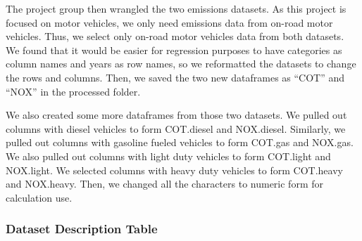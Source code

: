 \documentclass[
  12pt,
]{article}
\begin{document}
The project group then wrangled the two emissions datasets. As this
project is focused on motor vehicles, we only need emissions data from
on-road motor vehicles. Thus, we select only on-road motor vehicles data
from both datasets. We found that it would be easier for regression
purposes to have categories as column names and years as row names, so
we reformatted the datasets to change the rows and columns. Then, we
saved the two new dataframes as ``COT'' and ``NOX'' in the processed
folder.

We also created some more dataframes from those two datasets. We pulled
out columns with diesel vehicles to form COT.diesel and NOX.diesel.
Similarly, we pulled out columns with gasoline fueled vehicles to form
COT.gas and NOX.gas. We also pulled out columns with light duty vehicles
to form COT.light and NOX.light. We selected columns with heavy duty
vehicles to form COT.heavy and NOX.heavy. Then, we changed all the
characters to numeric form for calculation use.

\hypertarget{dataset-description-table}{%
\subsubsection{Dataset Description
Table}\label{dataset-description-table}}
\end{document}
